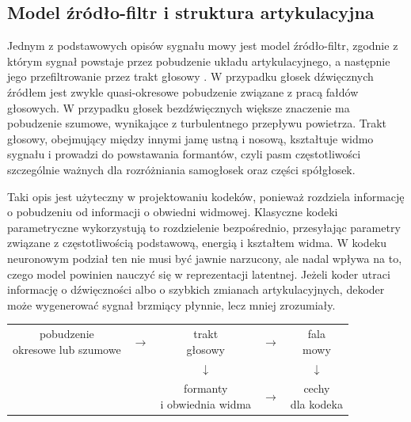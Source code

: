 \subsection{Model źródło-filtr i struktura artykulacyjna}
\label{subsec:model-zrodlo-filtr}

Jednym z podstawowych opisów sygnału mowy jest model źródło-filtr, zgodnie z którym sygnał powstaje przez pobudzenie układu artykulacyjnego, a następnie jego przefiltrowanie przez trakt głosowy \cite{Fant1960AcousticTheory,Stevens1998AcousticPhonetics}. W przypadku głosek dźwięcznych źródłem jest zwykle quasi-okresowe pobudzenie związane z pracą fałdów głosowych. W przypadku głosek bezdźwięcznych większe znaczenie ma pobudzenie szumowe, wynikające z turbulentnego przepływu powietrza. Trakt głosowy, obejmujący między innymi jamę ustną i nosową, kształtuje widmo sygnału i prowadzi do powstawania formantów, czyli pasm częstotliwości szczególnie ważnych dla rozróżniania samogłosek oraz części spółgłosek.

Taki opis jest użyteczny w projektowaniu kodeków, ponieważ rozdziela informację o pobudzeniu od informacji o obwiedni widmowej. Klasyczne kodeki parametryczne wykorzystują to rozdzielenie bezpośrednio, przesyłając parametry związane z częstotliwością podstawową, energią i kształtem widma. W kodeku neuronowym podział ten nie musi być jawnie narzucony, ale nadal wpływa na to, czego model powinien nauczyć się w reprezentacji latentnej. Jeżeli koder utraci informację o dźwięczności albo o szybkich zmianach artykulacyjnych, dekoder może wygenerować sygnał brzmiący płynnie, lecz mniej zrozumiały.

\begin{center}
\centering
\footnotesize
\setlength{\tabcolsep}{3pt}
\begin{tabular}{c c c c c}
\fbox{\parbox{0.17\textwidth}{\centering pobudzenie\\okresowe lub szumowe}} &
\(\rightarrow\) &
\fbox{\parbox{0.17\textwidth}{\centering trakt\\głosowy}} &
\(\rightarrow\) &
\fbox{\parbox{0.17\textwidth}{\centering fala\\mowy}} \\
 & & \(\downarrow\) & & \(\downarrow\) \\
 & & \fbox{\parbox{0.17\textwidth}{\centering formanty\\i obwiednia widma}} &
\(\rightarrow\) &
\fbox{\parbox{0.17\textwidth}{\centering cechy\\dla kodeka}} \\
\end{tabular}
\label{fig:model-zrodlo-filtr}
\end{center}

